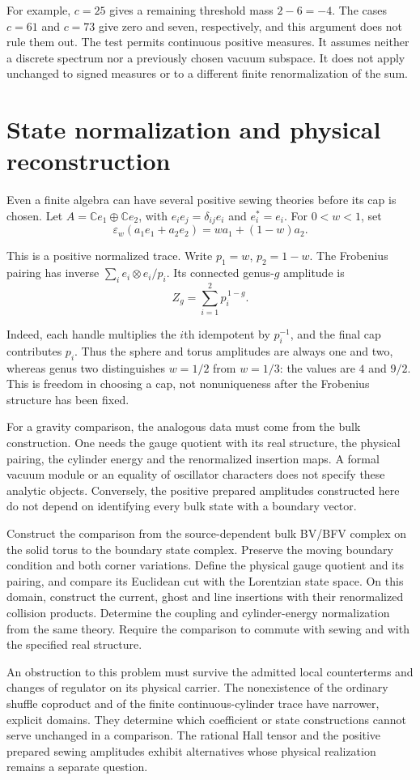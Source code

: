 For example, $c=25$ gives a remaining threshold mass $2-6=-4$.
The cases $c=61$ and $c=73$ give zero and seven, respectively, and
this argument does not rule them out. The test permits continuous
positive measures. It assumes neither a discrete spectrum nor a
previously chosen vacuum subspace. It does not apply unchanged to
signed measures or to a different finite renormalization of the sum.

\section{State normalization and physical reconstruction}

Even a finite algebra can have several positive sewing theories
before its cap is chosen. Let
$A=\mathbb Ce_1\oplus\mathbb Ce_2$, with
$e_ie_j=\delta_{ij}e_i$ and $e_i^*=e_i$. For $0<w<1$, set
\[
 \varepsilon_w(a_1e_1+a_2e_2)=wa_1+(1-w)a_2.
\]

This is a positive normalized trace. Write $p_1=w$, $p_2=1-w$.
The Frobenius pairing has inverse
$\sum_i e_i\otimes e_i/p_i$. Its connected genus-$g$ amplitude is
\[
 Z_g=\sum_{i=1}^2p_i^{\,1-g}.
\]

Indeed, each handle multiplies the $i$th idempotent by $p_i^{-1}$,
and the final cap contributes $p_i$. Thus the sphere and torus
amplitudes are always one and two, whereas genus two distinguishes
$w=1/2$ from $w=1/3$: the values are $4$ and $9/2$.
This is freedom in choosing a cap, not nonuniqueness after the
Frobenius structure has been fixed.

For a gravity comparison, the analogous data must come from the
bulk construction. One needs the gauge quotient with its real
structure, the physical pairing, the cylinder energy and the
renormalized insertion maps. A formal vacuum module or an equality
of oscillator characters does not specify these analytic objects.
Conversely, the positive prepared amplitudes constructed here do
not depend on identifying every bulk state with a boundary vector.

\begin{problem}\label{mht:prob:gravity-physical-comparison}
Construct the comparison from the source-dependent bulk BV/BFV
complex on the solid torus to the boundary state complex. Preserve
the moving boundary condition and both corner variations. Define
the physical gauge quotient and its pairing, and compare its
Euclidean cut with the Lorentzian state space. On this domain,
construct the current, ghost and line insertions with their
renormalized collision products. Determine the coupling and
cylinder-energy normalization from the same theory. Require the
comparison to commute with sewing and with the specified real
structure.
\end{problem}

An obstruction to this problem must survive the admitted local
counterterms and changes of regulator on its physical carrier.
The nonexistence of the ordinary shuffle coproduct and of the finite
continuous-cylinder trace have narrower, explicit domains.
They determine which coefficient or state constructions cannot
serve unchanged in a comparison. The rational Hall tensor and the
positive prepared sewing amplitudes exhibit alternatives whose
physical realization remains a separate question.
